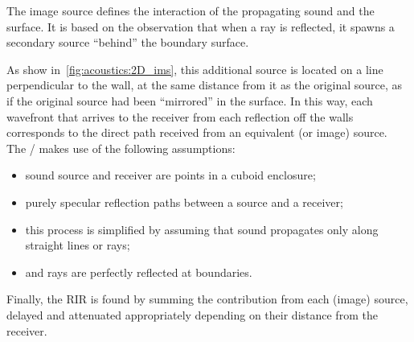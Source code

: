 \begin{figure}[h]
    \resizebox{\linewidth}{!}{
        
    }
\end{figure}

\noindent The image source defines the interaction of the propagating sound and the surface.
It is based on the observation that when a ray is reflected, it spawns a secondary source ``behind'' the boundary surface.

\begin{figure}[h]
    \resizebox{\linewidth}{!}{
        
    }
\end{figure}
\noindent As show in~\cref{fig:acoustics:2D_ims}, this additional source is located on a line perpendicular to the wall, at the same distance from it as the original source, as if the original source had been “mirrored” in the surface.
In this way, each wavefront that arrives to the receiver from each reflection off the walls corresponds to the direct path received from an equivalent (or image) source.
\\The \ISM/ makes use of the following assumptions:
\begin{itemize}
    \item sound source and receiver are points in a cuboid enclosure;
    \item purely specular reflection paths between a source and a receiver;
    \item this process is simplified by assuming that sound propagates only along straight lines or rays;
    \item and rays are perfectly reflected at boundaries.
\end{itemize}
Finally, the \ac{RIR} is found by summing the contribution from each (image) source, delayed and attenuated appropriately depending on their distance from the receiver.
